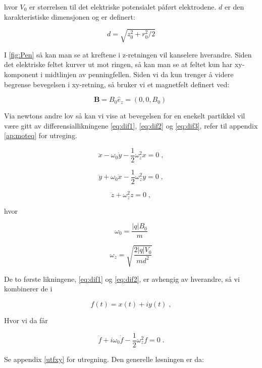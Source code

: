 \documentclass[reprint,english,notitlepage, nofootinbib]{revtex4-1}  %
\begin{document}
hvor $V_0$ er størrelsen til det elektriske potensialet påført elektrodene. $d$ er den karakteristiske dimensjonen og er definert:

\begin{equation}\label{d}
d = \sqrt{z_0^2 + r_0^2/2}
\end{equation}

I \autoref{fig:Pen} så kan man se at kreftene i z-retningen vil kanselere hverandre. Siden det elektriske feltet kurver ut mot ringen, så kan man se at feltet kun har xy-komponent i midtlinjen av penningfellen. Siden vi da kun trenger å videre begrense bevegelsen i xy-retning, så bruker vi et magnetfelt definert ved:

\begin{equation}\label{B}
\mathbf{B} = B_0\hat{e}_z = \left ( 0, 0, B_0 \right ) \;
\end{equation}

Via newtons andre lov så kan vi vise at bevegelsen for en enekelt partikkel vil være gitt av differensiallikningene \eqref{eq:dif1}, \eqref{eq:dif2} og \eqref{eq:dif3}, refer til appendix \ref{ap:moteq} for utreging. 

\begin{equation} \label{eq:dif1}
\ddot{x} - \omega_0 \dot{y} - \frac{1}{2}\omega_z^2 x = 0 \; ,
\end{equation}

\begin{equation}\label{eq:dif2}
\ddot{y} + \omega_0 \dot{x} - \frac{1}{2}\omega_z^2 y = 0 \; ,
\end{equation}

\begin{equation}\label{eq:dif3}
\ddot{z} + \omega_z^2 z = 0 \; ,
\end{equation}

hvor


$$\omega_0 = \frac{|q|B_0}{m}$$

$$ \omega_z = \sqrt{\frac{2|q|V_0}{md^2}}$$

De to første likningene, \eqref{eq:dif1} og \eqref{eq:dif2}, er avhengig av hverandre, så vi kombinerer de i

$$
f(t) = x(t) + iy(t) \; ,
$$

Hvor vi da får 

\begin{equation}\label{fxy}
\ddot{f} + i\omega_0 \dot{f} - \frac{1}{2} \omega_z^2 f = 0 \; .
\end{equation}

Se appendix \ref{utfxy} for utregning. Den generelle løsningen er da:
\end{document}
